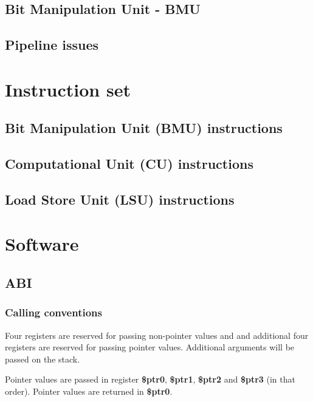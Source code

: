 \documentclass[11pt]{book}
\begin{document}
\section{Bit Manipulation Unit - BMU}

\section{Pipeline issues}

\newpage
\chapter{Instruction set}
\newpage
\section{Bit Manipulation Unit (BMU) instructions}

\newpage
\section{Computational Unit (CU) instructions}

\newpage
\section{Load Store Unit (LSU) instructions}


\chapter{Software}
\section{ABI}
\subsection{Calling conventions}
Four registers are reserved for passing non-pointer values and and
additional four registers are reserved for passing pointer
values. Additional arguments will be passed on the stack.

Pointer values are passed in register \textbf{\$ptr0},
\textbf{\$ptr1}, \textbf{\$ptr2} and \textbf{\$ptr3} (in that
order). Pointer values are returned in \textbf{\$ptr0}.
\end{document}
